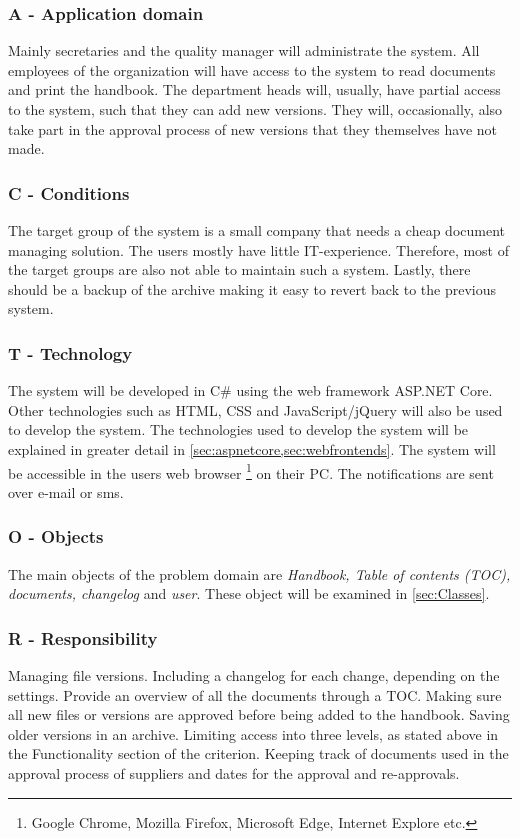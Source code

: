 \subsubsection*{A - Application domain}
Mainly secretaries and the quality manager will administrate the system.
All employees of the organization will have access to the system to read documents and print the handbook.
The department heads will, usually, have partial access to the system, such that they can add new versions.
They will, occasionally, also take part in the approval process of new versions that they themselves have not made.

\subsubsection*{C - Conditions} \label{sec:conditions}
The target group of the system is a small company that needs a cheap document managing solution.
The users mostly have little IT-experience.
Therefore, most of the target groups are also not able to maintain such a system.
Lastly, there should be a backup of the archive making it easy to revert back to the previous system.

\subsubsection*{T - Technology}
The system will be developed in C\# using the web framework ASP.NET Core.
Other technologies such as HTML, CSS and JavaScript/jQuery will also be used to develop the system.
The technologies used to develop the system will be explained in greater detail in \cref{sec:aspnetcore,sec:webfrontends}.
The system will be accessible in the users web browser \footnote{Google Chrome, Mozilla Firefox, Microsoft Edge, Internet Explore etc.} on their PC.
The notifications are sent over e-mail or sms.

\subsubsection*{O - Objects}
The main objects of the problem domain are \textit{Handbook, Table of contents (TOC), documents, changelog} and \textit{user}.
These object will be examined in \cref{sec:Classes}.

\subsubsection*{R  - Responsibility}
Managing file versions.
Including a changelog for each change, depending on the settings.
Provide an overview of all the documents through a TOC.
Making sure all new files or versions are approved before being added to the handbook.
Saving older versions in an archive.
Limiting access into three levels, as stated above in the Functionality section of the criterion.
Keeping track of documents used in the approval process of suppliers and dates for the approval and re-approvals.

